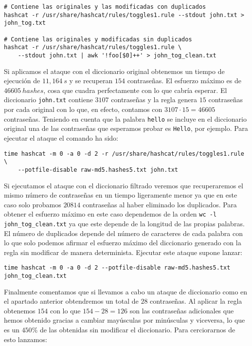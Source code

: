 \documentclass{article}
\begin{document}
            \begin{verbatim}
# Contiene las originales y las modificadas con duplicados
hashcat -r /usr/share/hashcat/rules/toggles1.rule --stdout john.txt > john_tog.txt

# Contiene las originales y modificadas sin duplicados
hashcat -r /usr/share/hashcat/rules/toggles1.rule \
    --stdout john.txt | awk '!foo[$0]++' > john_tog_clean.txt
            \end{verbatim}

            Si aplicamos el ataque con el diccionario original obtenemos un tiempo de ejecución de $11,164\ s$ y se recuperan $154$ contraseñas. El esfuerzo máximo es de $46605\ hashes$, cosa que cuadra perfectamente con lo que cabría esperar. El diccionario \texttt{john.txt} contiene $3107$ contraseñas y la regla genera $15$ contraseñas por cada original con lo que, en efecto, contamos con $3107 \cdot 15 = 46605$ contraseñas. Teniendo en cuenta que la palabra \texttt{hello} se incluye en el diccionario original una de las contraseñas que esperamos probar es \texttt{Hello}, por ejemplo. Para ejecutar el ataque el comando ha sido:


            \begin{verbatim}
time hashcat -m 0 -a 0 -d 2 -r /usr/share/hashcat/rules/toggles1.rule \
    --potfile-disable raw-md5.hashes5.txt john.txt
            \end{verbatim}

            Si ejecutamos el ataque con el diccionario filtrado veremos que recuperaremos el mismo número de contraseñas en un tiempo ligeramente menor ya que en este caso solo probamos $20814$ contraseñas al haber eliminado los duplicados. Para obtener el esfuerzo máximo en este caso dependemos de la orden \texttt{wc -l john\_tog\_clean.txt} ya que este depende de la longitud de las propias palabras. El número de duplicados depende del número de caracteres de cada palabra con lo que solo podemos afirmar el esfuerzo máximo del diccionario generado con la regla sin modificar de manera determinista. Ejecutar este ataque supone lanzar:

            \begin{verbatim}
time hashcat -m 0 -a 0 -d 2 --potfile-disable raw-md5.hashes5.txt john_tog_clean.txt
            \end{verbatim}

            Finalmente comentamos que si llevamos a cabo un ataque de diccionario como en el apartado anterior obtendremos un total de $28$ contraseñas. Al aplicar la regla obtenemos $154$ con lo que $154 - 28 = 126$ son las contraseñas adicionales que hemos obtenido gracias a cambiar mayúsculas por minúsculas y viceversa, lo que es un $450\%$ de las obtenidas sin modificar el diccionario. Para cerciorarnos de esto lanzamos:
            
\end{document}
